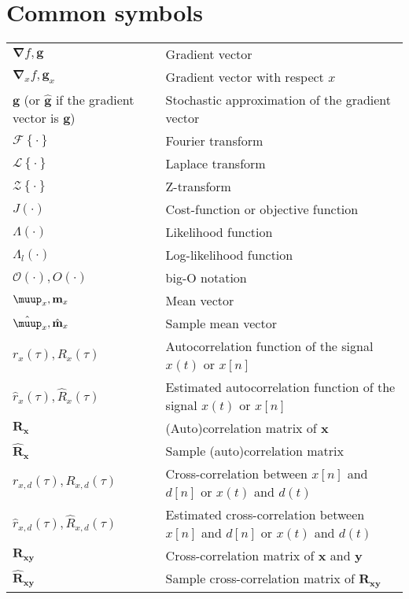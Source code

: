 \documentclass{article}
\begin{document}
\section{Common symbols}
\begin{xltabular}{\textwidth}{XX}
    \(\boldsymbol{\nabla}f, \mathbf{g}\) & Gradient vector \\
    \(\boldsymbol{\nabla}_{x}f, \mathbf{g}_{x}\) & Gradient vector with respect \(x\)\\
    \(\mathbf{g}\) (or \(\hat{\mathbf{g}}\) if the gradient vector is \(\mathbf{g}\)) & Stochastic approximation of the gradient vector \\
    \(\mathcal{F}\left\{ \cdot \right\}\) & Fourier transform\\
    \(\mathcal{L}\left\{ \cdot \right\}\) & Laplace transform\\
    \(\mathcal{Z}\left\{ \cdot \right\}\) & Z-transform\\
    \(J(\cdot)\) & Cost-function or objective function\\
    \(\Lambda(\cdot)\) & Likelihood function\\
    \(\Lambda_l(\cdot)\) & Log-likelihood function\\
    \(\mathcal{O}(\cdot), O(\cdot)\) & big-O notation\\
    \(\boldsymbol{\muup}_x, \mathbf{m}_x\) & Mean vector\\
    \(\hat{\boldsymbol{\muup}}_x, \hat{\mathbf{m}}_x\) & Sample mean vector\\
    \(r_x(\tau), R_x(\tau)\) & Autocorrelation function of the signal \(x(t)\) or \(x[n]\)\\
    \(\hat{r}_x(\tau), \hat{R}_x(\tau)\) & Estimated autocorrelation function of the signal \(x(t)\) or \(x[n]\)\\
    \(\mathbf{R}_\mathbf{x}\) & (Auto)correlation matrix of \(\mathbf{x}\) \\
    \(\hat{\mathbf{R}}_\mathbf{x}\) & Sample (auto)correlation matrix \\
    \(r_{x,d}(\tau), R_{x,d}(\tau)\) & Cross-correlation between \(x[n]\) and \(d[n]\) or \(x(t)\) and \(d(t)\)\\
    \(\hat{r}_{x,d}(\tau), \hat{R}_{x,d}(\tau)\) & Estimated cross-correlation between \(x[n]\) and \(d[n]\) or \(x(t)\) and \(d(t)\)\\
    \(\mathbf{R}_\mathbf{xy}\) & Cross-correlation matrix of \(\mathbf{x}\) and \(\mathbf{y}\)\\
    \(\hat{\mathbf{R}}_\mathbf{xy}\) & Sample cross-correlation matrix of \(\mathbf{R}_\mathbf{xy}\) \\

\end{xltabular}
\end{document}
